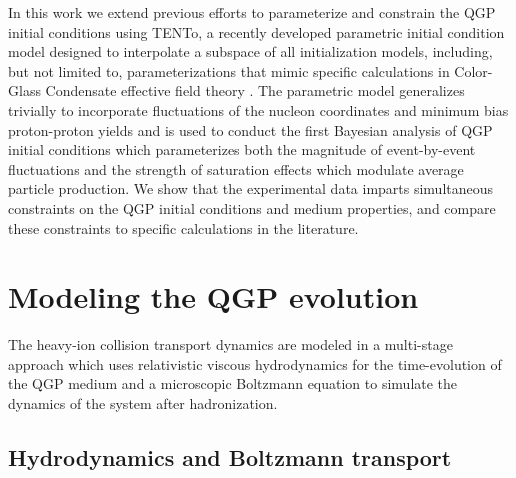 \documentclass[aps,prc,reprint,amsmath,nofootinbib,superscriptaddress]{revtex4-1}
\newcommand{\trento}{T\raisebox{-0.5ex}{R}ENTo}
\begin{document}
In this work we extend previous efforts to parameterize and constrain the QGP initial conditions using \trento , a recently developed parametric initial condition model designed to interpolate a subspace of all initialization models, including, but not limited to, parameterizations that mimic specific calculations in Color-Glass Condensate effective field theory \cite{Moreland:2014oya}.
The parametric model generalizes trivially to incorporate fluctuations of the nucleon coordinates and minimum bias proton-proton yields and is used to conduct the first Bayesian analysis of QGP initial conditions which parameterizes both the magnitude of event-by-event fluctuations and the strength of saturation effects which modulate average particle production.
We show that the experimental data imparts simultaneous constraints on the QGP initial conditions and medium properties, and compare these constraints to specific calculations in the literature.


\section{Modeling the QGP evolution}

The heavy-ion collision transport dynamics are modeled in a multi-stage approach which uses relativistic viscous hydrodynamics for the time-evolution of the QGP medium and a microscopic Boltzmann equation to simulate the dynamics of the system after hadronization.

\subsection{Hydrodynamics and Boltzmann transport}
\end{document}
